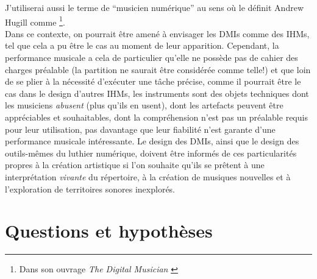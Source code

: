 \noindent J'utiliserai aussi le terme de ``musicien numérique'' au sens où le définit Andrew Hugill comme \footnote{Dans son ouvrage \textit{The Digital Musician} \cite{hugill_digital_2008}}.\\
\indent Dans ce contexte, on pourrait être amené à envisager les \glspl{DMI} comme des \glspl{IHM}, tel que cela a pu être le cas au moment de leur apparition. Cependant, la performance musicale a cela de particulier qu'elle ne possède pas de cahier des charges préalable (la partition ne saurait être considérée comme telle!) et que loin de se plier à la nécessité d'exécuter une tâche précise, comme il pourrait être le cas dans le design d'autres \glspl{IHM}, les instruments sont des objets techniques dont les musiciens \textit{abusent} (plus qu'ils en usent), dont les artefacts peuvent être appréciables et souhaitables, dont la compréhension n'est pas un préalable requis pour leur utilisation, pas davantage que leur fiabilité n'est garante d'une performance musicale intéressante. Le design des \glspl{DMI}, ainsi que le design des outils-mêmes du luthier numérique, doivent être informés de ces particularités propres à la création artistique si l'on souhaite qu'ils se prêtent à une interprétation \textit{vivante} du répertoire, à la création de musiques nouvelles et à l'exploration de territoires sonores inexplorés.


\section{Questions et hypothèses}

